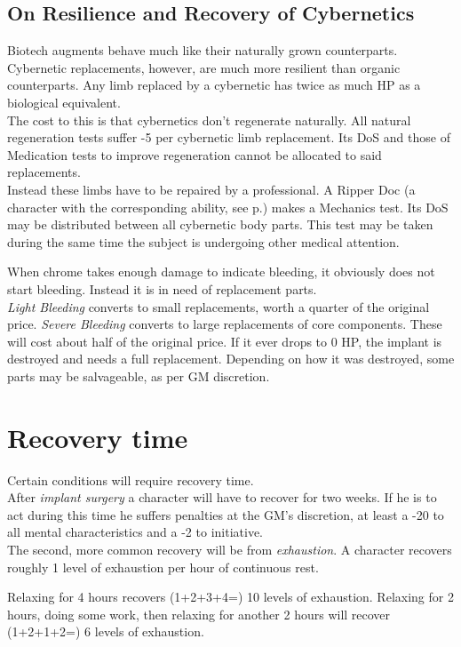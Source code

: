 \documentclass[12pt,a4paper,openany,dvipsnames]{book}
\begin{document}
	\subsection{On Resilience and Recovery of Cybernetics}
	Biotech augments behave much like their naturally grown counterparts.
	Cybernetic replacements, however, are much more resilient than organic counterparts.
	Any limb replaced by a cybernetic has twice as much HP as a biological equivalent.
	\\%
	The cost to this is that cybernetics don't regenerate naturally.
	All natural regeneration tests suffer -5 per cybernetic limb replacement.
	Its DoS and those of Medication tests to improve regeneration cannot be allocated to said replacements.
	\\%
	Instead these limbs have to be repaired by a professional.
	A Ripper Doc (a character with the corresponding ability, see p.\pageref{ability:ripperdoc}) makes a Mechanics test.
	Its DoS may be distributed between all cybernetic body parts.
	This test may be taken during the same time the subject is undergoing other medical attention.
	\par%
	When chrome takes enough damage to indicate bleeding,
		it obviously does not start bleeding.
	Instead it is in need of replacement parts.
	\\%
	\emph{Light Bleeding} converts to small replacements, worth a quarter of the original price.
	\emph{Severe Bleeding} converts to large replacements of core components.
	These will cost about half of the original price.
	If it ever drops to 0 HP,
		the implant is destroyed and needs a full replacement.
	Depending on how it was destroyed,
		some parts may be salvageable,
		as per GM discretion.
	\section{Recovery time}
	Certain conditions will require recovery time.\\
	After \emph{implant surgery} a character will have to recover for two weeks. If he is to act during this time he suffers penalties at the GM’s discretion, at least a -20 to all mental characteristics and a -2 to initiative.\\
	The second, more common recovery will be from \emph{exhaustion}.
	A character recovers roughly 1 level of exhaustion per hour of continuous rest.
	\begin{exampleblock}
		Relaxing for 4 hours recovers (1+2+3+4=) 10 levels of exhaustion.
		Relaxing for 2 hours,
			doing some work,
			then relaxing for another 2 hours
			will recover (1+2+1+2=) 6 levels of exhaustion.
	\end{exampleblock}
\end{document}
